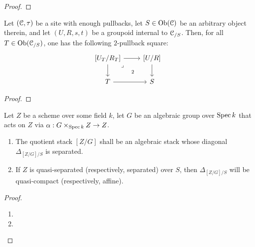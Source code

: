                 \begin{proof}
                    
                \end{proof}
            \begin{lemma} \label{lemma: base_changing_quotient_stacks}
                Let $(\mathcal{C}, \tau)$ be a site with enough pullbacks, let $S \in \mathrm{Ob}(\mathcal{C})$ be an arbitrary object therein, and let $(U, R, s, t)$ be a groupoid internal to $\mathcal{C}_{/S}$. Then, for all $T \in \mathrm{Ob}(\mathcal{C}_{/S})$, one has the following $2$-pullback square:
                    $$
                        \begin{tikzcd}
                        	{[U_T/R_T]} & {[U/R]} \\
                        	T & S
                        	\arrow[from=1-1, to=1-2]
                        	\arrow[from=1-2, to=2-2]
                        	\arrow[from=1-1, to=2-1]
                        	\arrow[from=2-1, to=2-2]
                        	\arrow["2"{description}, "\lrcorner"{anchor=center, pos=0.125}, draw=none, from=1-1, to=2-2]
                        \end{tikzcd}
                    $$
            \end{lemma}
                \begin{proof}
                    
                \end{proof}
            \begin{proposition} \label{prop: quotients_of_schemes_by_algebraic_groups_are_algebraic_stacks}
                Let $Z$ be a scheme over some field $k$, let $G$ be an algebraic group over $\operatorname{Spec} k$ that acts on $Z$ via $\alpha: G \x_{\Spec k} Z \to Z$. 
                    \begin{enumerate}
                        \item The quotient stack $[Z/G]$ shall be an algebraic stack whose diagonal $\Delta_{[Z/G]/S}$ is separated. 
                        \item If $Z$ is quasi-separated (respectively, separated) over $S$, then $\Delta_{[Z/G]/S}$ will be quasi-compact (respectively, affine).
                    \end{enumerate}
            \end{proposition}
                \begin{proof}
                    \noindent
                    \begin{enumerate}
                        \item 
                        \item 
                    \end{enumerate}
                \end{proof}
                
